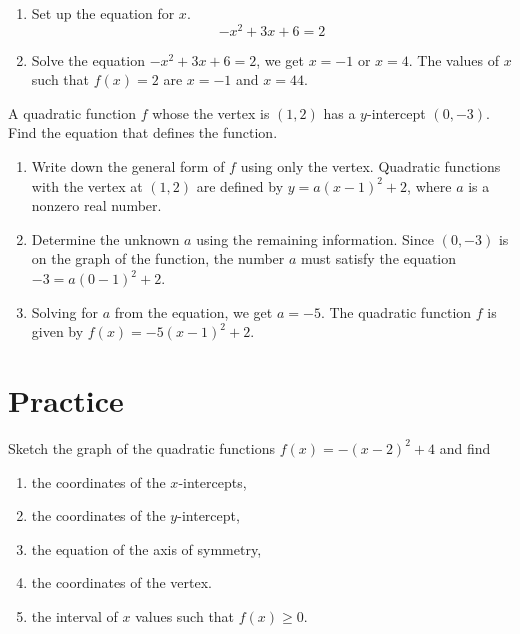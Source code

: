 \documentclass[en,12pt]{elegantbook}
\providecommand{\tightlist}{%
  \setlength{\itemsep}{0pt}\setlength{\parskip}{0pt}}
\providecommand{\tightlist}{%
  \setlength{\itemsep}{0pt}\setlength{\parskip}{0pt}}
\let\BeginKnitrBlock\begin \let\EndKnitrBlock\end
\begin{document}
\BeginKnitrBlock{solution}


\begin{enumerate}
\def\labelenumi{\arabic{enumi}.}
\tightlist
\item
  Set up the equation for \(x\).
  \[-x^2+3x+6=2\]
\item
  Solve the equation \(-x^2+3x+6=2\), we get \(x=-1\) or \(x=4\).
  The values of \(x\) such that \(f(x)=2\) are \(x=-1\) and \(x=44\).
\end{enumerate}
\EndKnitrBlock{solution}

\BeginKnitrBlock{example}
\protect\hypertarget{exm:unnamed-chunk-262}{}{\label{exm:unnamed-chunk-262} }
A quadratic function \(f\) whose the vertex is \((1, 2)\) has a \(y\)-intercept \((0, -3)\). Find the equation that defines the function.
\EndKnitrBlock{example}

\BeginKnitrBlock{solution}


\begin{enumerate}
\def\labelenumi{\arabic{enumi}.}
\tightlist
\item
  Write down the general form of \(f\) using only the vertex.
  Quadratic functions with the vertex at \((1,2)\) are defined by \(y=a(x-1)^2+2\), where \(a\) is a nonzero real number.
\item
  Determine the unknown \(a\) using the remaining information.
  Since \((0, -3)\) is on the graph of the function, the number \(a\) must satisfy the equation \(-3=a(0-1)^2+2\).
\item
  Solving for \(a\) from the equation, we get \(a=-5\).
  The quadratic function \(f\) is given by \(f(x)=-5(x-1)^2+2\).
\end{enumerate}
\EndKnitrBlock{solution}

\hypertarget{practice-12}{%
\section{Practice}\label{practice-12}}

\BeginKnitrBlock{exercise}
\protect\hypertarget{exr:unnamed-chunk-264}{}{\label{exr:unnamed-chunk-264} }
Sketch the graph of the quadratic functions \(f(x)=-(x-2)^2+4\) and find

\begin{enumerate}
\def\labelenumi{\arabic{enumi}.}
\tightlist
\item
  the coordinates of the \(x\)-intercepts,
\item
  the coordinates of the \(y\)-intercept,
\item
  the equation of the axis of symmetry,
\item
  the coordinates of the vertex.
\item
  the interval of \(x\) values such that \(f(x)\geq 0\).
\end{enumerate}
\EndKnitrBlock{exercise}
\end{document}
